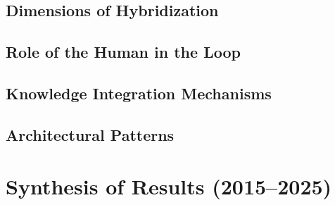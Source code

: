 \documentclass[preprint,12pt]{elsarticle}
\begin{document}
	\subsection{Dimensions of Hybridization}
	
	\subsection{Role of the Human in the Loop}
	
	\subsection{Knowledge Integration Mechanisms}
	
	\subsection{Architectural Patterns}
	
	\section{Synthesis of Results (2015--2025)}
	
\end{document}
